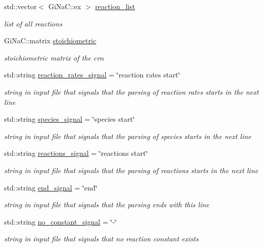\begin{DoxyCompactItemize}
std\+::vector$<$ Gi\+Na\+C\+::ex $>$ \mbox{\hyperlink{classCRN_a3c02ee72c45eabb20591e0556e0b611e}{reaction\+\_\+list}}
\begin{DoxyCompactList}\small\item\em list of all reactions \end{DoxyCompactList}\item 
Gi\+Na\+C\+::matrix \mbox{\hyperlink{classCRN_a2fc9c358b31175f36e569bebcf6809b5}{stoichiometric}}
\begin{DoxyCompactList}\small\item\em stoichiometric matrix of the crn \end{DoxyCompactList}\item 
std\+::string \mbox{\hyperlink{classCRN_a90756566693c70e08991c37c3ec21d38}{reaction\+\_\+rates\+\_\+signal}} = \char`\"{}reaction rates start\char`\"{}
\begin{DoxyCompactList}\small\item\em string in input file that signals that the parsing of reaction rates starts in the next line \end{DoxyCompactList}\item 
std\+::string \mbox{\hyperlink{classCRN_a47d1cac1fe4387b2b643ef2c6b6f5617}{species\+\_\+signal}} = \char`\"{}species start\char`\"{}
\begin{DoxyCompactList}\small\item\em string in input file that signals that the parsing of species starts in the next line \end{DoxyCompactList}\item 
std\+::string \mbox{\hyperlink{classCRN_aa71d714d674ed916e9acc03b7c6163ef}{reactions\+\_\+signal}} = \char`\"{}reactions start\char`\"{}
\begin{DoxyCompactList}\small\item\em string in input file that signals that the parsing of reactions starts in the next line \end{DoxyCompactList}\item 
std\+::string \mbox{\hyperlink{classCRN_a7813e054c6e9ec84bc052a84c7ca2b11}{end\+\_\+signal}} = \char`\"{}end\char`\"{}
\begin{DoxyCompactList}\small\item\em string in input file that signals that the parsing ends with this line \end{DoxyCompactList}\item 
std\+::string \mbox{\hyperlink{classCRN_addd46160b590b36ba15b6fb91f591758}{no\+\_\+constant\+\_\+signal}} = \char`\"{}-\/\char`\"{}
\begin{DoxyCompactList}\small\item\em string in input file that signals that no reaction constant exists \end{DoxyCompactList}\end{DoxyCompactItemize}


